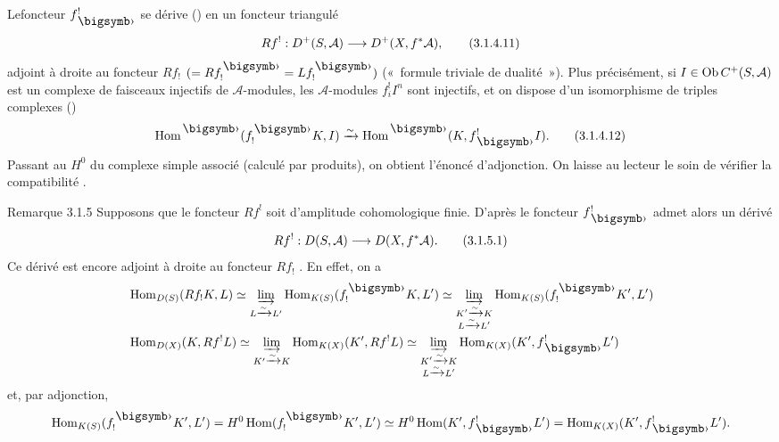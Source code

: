 \documentclass[10pt]{../fichiers-configuration-latex/smfart}
\begin{document}
Le\pageoriginale foncteur $f^{!}_{\bigdot}$ se dérive
() en un foncteur triangulé
\begin{equation*}
Rf^{!}:D^{+}(S,\mathcal{A})\longrightarrow
D^{+}(X,f^{\ast}\mathcal{A}){},\tag{3.1.4.11}
\end{equation*}%
adjoint à droite au foncteur $Rf_{!}$
$(=Rf^{\bigdot}_{!}=Lf^{\bigdot}_{!})$ (« formule triviale de
dualité »). Plus précisément, si $I\in \operatorname{Ob} C^{+}(S,\mathcal{A})$
est un complexe de faisceaux injectifs de $\mathcal{A}$-modules, les
$\mathcal{A}$-modules $f^{!}_{i} I^{n}$ sont injectifs, et on dispose
d'un isomorphisme de triples complexes ()
\begin{equation*}
\Hom^{\bigdot}(f^{\bigdot}_{!}K, I)\xrightarrow{\sim}
\Hom^{\bigdot}(K,f^{!}_{\bigdot}I){\quoi}.\tag{3.1.4.12}
\end{equation*}%
Passant au $H^{0}$ du complexe simple associé (calculé par produits),
on obtient l'énoncé d'adjonction. On laisse au lecteur le soin de
vérifier la compatibilité .

\begin{enonce*}[remark]{Remarque 3.1.5}
Supposons que le foncteur $Rf^{!}$ soit d'amplitude cohomologique
finie. D'après  le foncteur $f^{!}_{\bigdot}$ admet alors
un dérivé
\begin{equation*}
Rf^{!}:D(S,\mathcal{A})\longrightarrow D(X,f^{\ast}\mathcal{A}){}.\tag{3.1.5.1}
\end{equation*}%
Ce dérivé est encore adjoint à droite au foncteur $Rf_{!}$
. En effet, on a
\begin{align*}
& \Hom_{D(S)}(Rf_{!}K,L)\simeq
\varinjlim_{L\xrightarrow{\sim}L'}\Hom_{K(S)}(f^{\bigdot}_{!}K,L')\simeq
\varinjlim_{\substack{K'\xrightarrow{\sim}K\\ L\xrightarrow{\sim}
L'}}\Hom_{K(S)} (f^{\bigdot}_{!}K', L')\\
& \Hom_{D(X)}(K,Rf^{!}L)\simeq
\varinjlim_{K'\xrightarrow{\sim}K}\Hom_{K(X)}(K',Rf^{!}L)\simeq
\varinjlim_{\substack{K'\xrightarrow{\sim}K\\
L\xrightarrow{\sim}L'}}\Hom_{K(X)}(K', f^{!}_{\bigdot}L')
\end{align*}
et, par adjonction,
$$
\Hom_{K(S)}(f^{\bigdot}_{!}K',L')=H^{0}\Hom(f^{\bigdot}_{!}K',L')\simeq
H^{0}\Hom(K',f^{!}_{\bigdot}L')=\Hom_{K(X)}(K',f^{!}_{\bigdot}L'){\quoi}.
$$
\end{enonce*}
\end{document}
